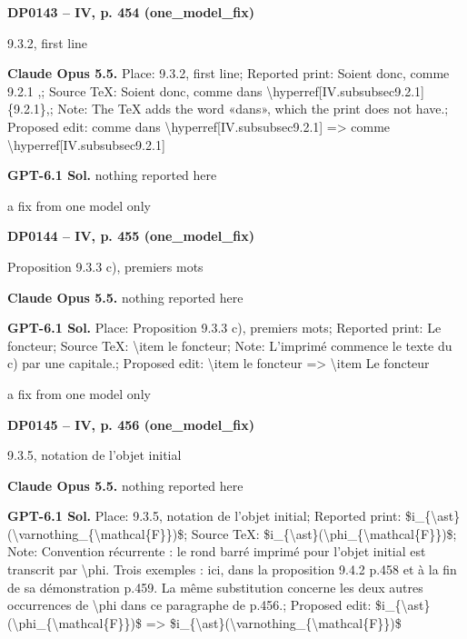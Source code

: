 \par\noindent\hypertarget{DP0143}{}\textbf{DP0143 -- IV, p. 454 (one\_model\_fix)}\par
9.3.2, first line\par
\textbf{Claude Opus 5.5.} Place: 9.3.2, first line; Reported print: Soient donc, comme 9.2.1 ,; Source TeX: Soient donc, comme dans \textbackslash{}hyperref[IV.subsubsec9.2.1]\{9.2.1\},; Note: The TeX adds the word «dans», which the print does not have.; Proposed edit: comme dans \textbackslash{}hyperref[IV.subsubsec9.2.1] =\allowbreak > comme \textbackslash{}hyperref[IV.subsubsec9.2.1]\par
\textbf{GPT-6.1 Sol.} nothing reported here\par
a fix from one model only\par
\par\noindent\hypertarget{DP0144}{}\textbf{DP0144 -- IV, p. 455 (one\_model\_fix)}\par
Proposition 9.3.3 c), premiers mots\par
\textbf{Claude Opus 5.5.} nothing reported here\par
\textbf{GPT-6.1 Sol.} Place: Proposition 9.3.3 c), premiers mots; Reported print: Le foncteur; Source TeX: \textbackslash{}item le foncteur; Note: L'imprimé commence le texte du c) par une capitale.; Proposed edit: \textbackslash{}item le foncteur =\allowbreak > \textbackslash{}item Le foncteur\par
a fix from one model only\par
\par\noindent\hypertarget{DP0145}{}\textbf{DP0145 -- IV, p. 456 (one\_model\_fix)}\par
9.3.5, notation de l'objet initial\par
\textbf{Claude Opus 5.5.} nothing reported here\par
\textbf{GPT-6.1 Sol.} Place: 9.3.5, notation de l'objet initial; Reported print: \$i\_\{\textbackslash{}ast\}(\textbackslash{}varnothing\_\{\textbackslash{}mathcal\{F\}\})\$; Source TeX: \$i\_\{\textbackslash{}ast\}(\textbackslash{}phi\_\{\textbackslash{}mathcal\{F\}\})\$; Note: Convention récurrente : le rond barré imprimé pour l'objet initial est transcrit par \textbackslash{}phi. Trois exemples : ici, dans la proposition 9.4.2 p.458 et à la fin de sa démonstration p.459. La même substitution concerne les deux autres occurrences de \textbackslash{}phi dans ce paragraphe de p.456.; Proposed edit: \$i\_\{\textbackslash{}ast\}(\textbackslash{}phi\_\{\textbackslash{}mathcal\{F\}\})\$ =\allowbreak > \$i\_\{\textbackslash{}ast\}(\textbackslash{}varnothing\_\{\textbackslash{}mathcal\{F\}\})\$\par
